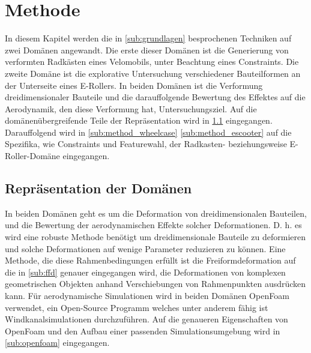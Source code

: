 \clearpage

\section{Methode}

In diesem Kapitel werden die in \cref{sub:grundlagen} besprochenen Techniken auf zwei Domänen angewandt.
Die erste dieser Domänen ist die Generierung von verformten Radkästen eines Velomobils, unter Beachtung eines Constraints.
Die zweite Domäne ist die explorative Untersuchung verschiedener Bauteilformen an der Unterseite eines E-Rollers.
In beiden Domänen ist die Verformung dreidimensionaler Bauteile und die darauffolgende Bewertung des Effektes auf die Aerodynamik, den diese Verformung hat, Untersuchungsziel.
Auf die domänenübergreifende Teile der Repräsentation wird in \cref{sub:representation} eingegangen.
Darauffolgend wird in \cref{sub:method_wheelcase} \cref{sub:method_escooter} auf die Spezifika, wie Constraints und Featurewahl, der Radkasten- beziehungsweise E-Roller-Domäne eingegangen.

\subsection{Repräsentation der Domänen}
\label{sub:representation}

In beiden Domänen geht es um die Deformation von dreidimensionalen Bauteilen, und die Bewertung der aerodynamischen Effekte solcher Deformationen.
D. h. es wird eine robuste Methode benötigt um dreidimensionale Bauteile zu deformieren und solche Deformationen auf wenige Parameter reduzieren zu können.
Eine Methode, die diese Rahmenbedingungen erfüllt ist die Freiformdeformation \cite{Sederberg.1986} auf die in \cref{sub:ffd} genauer eingegangen wird, die Deformationen von komplexen geometrischen Objekten anhand Verschiebungen von Rahmenpunkten ausdrücken kann.
Für aerodynamische Simulationen wird in beiden Domänen OpenFoam verwendet, ein Open-Source Programm welches unter anderem fähig ist Windkanalsimulationen durchzuführen.
Auf die genaueren Eigenschaften von OpenFoam und den Aufbau einer passenden Simulationsumgebung wird in \cref{sub:openfoam} eingegangen.

